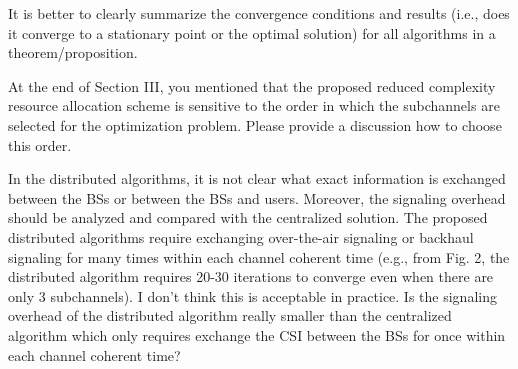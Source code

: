 \begin{itemize}
 It is better to clearly summarize the convergence conditions and results (i.e., does it converge to a stationary point or the optimal solution) for all algorithms in a theorem/proposition.

\resp {}

 At the end of Section III, you mentioned that the proposed reduced complexity resource allocation scheme is sensitive to the order in which the subchannels are selected for the optimization problem. Please provide a discussion how to choose this order.

\resp {}

 In the distributed algorithms, it is not clear what exact information is exchanged between the BSs or between the BSs and users. Moreover, the signaling overhead should be analyzed and compared with the centralized solution. The proposed distributed algorithms require exchanging over-the-air signaling or backhaul signaling for many times within each channel coherent time (e.g., from Fig. 2, the distributed algorithm requires 20-30 iterations to converge even when there are only 3 subchannels). I don’t think this is acceptable in practice. Is the signaling overhead of the distributed algorithm really smaller than the centralized algorithm which only requires exchange the CSI between the BSs for once within each channel coherent time?


\end{itemize}
